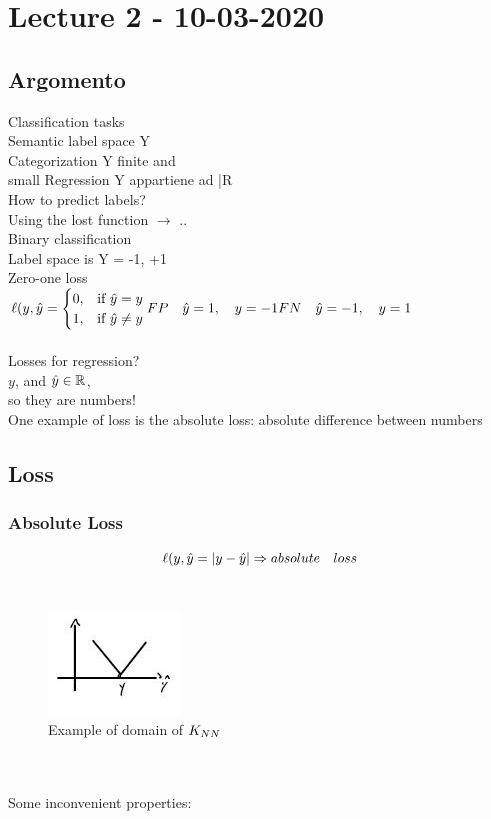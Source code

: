 \documentclass[../main.tex]{subfiles}
\begin{document}
\chapter{Lecture 2 - 10-03-2020}

\section{Argomento}
Classification tasks\\
Semantic label space Y\\
Categorization Y finite and\\ small
Regression Y appartiene ad |R\\
How to predict labels?\\
Using the lost function $\rightarrow$ ..\\
Binary classification\\
Label space is Y = { -1, +1 }\\
Zero-one loss\\

$
\ell(y,\hat{y} = \begin{cases} 0, & \mbox{if } \hat{y} = y 
\\ 1, & 
\mbox{if }\hat{y} \neq y
\end{cases}
\\\\
FP \quad \hat{y} = 1,\quad y = -1\\
FN \quad \hat{y} = -1, \quad y = 1
$
\\\\
Losses for regression?\\
$y$, and $\hat{y} \in \mathbb{R}$, \\so they are numbers!\\
One example of loss is the absolute loss: absolute difference between numbers\\
\section{Loss}
\subsection{Absolute Loss}
$$\ell(y,\hat{y} = | y - \hat{y} |  \Rightarrow absolute \quad loss\\ $$
\\
\begin{figure}[h]
    \centering
    \includegraphics[width=0.4\linewidth]{../img/lez2-img1.JPG}
    \caption{Example of domain of $K_{NN}$}
\end{figure}\\
\\
Some inconvenient properties:
\end{document}
